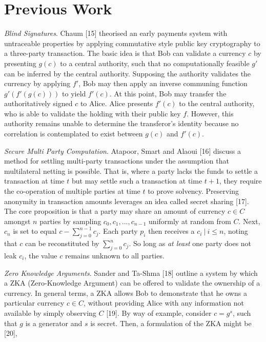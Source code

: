 \section{Previous Work}

\textit{Blind Signatures}. Chaum [15] theorised an early payments system with untraceable properties by applying commutative style public key cryptography to a three-party transaction. The basic idea is that Bob can validate a currency $c$ by presenting $g(c)$ to a central authority, such that no computationally feasible $g'$ can be inferred by the central authority. Supposing the authority validates the currency by applying $f'$, Bob may then apply an inverse communing function $g'(f'(g(c)))$ to yield $f'(c)$. At this point, Bob may transfer the authoritatively signed $c$ to Alice. Alice presents $f'(c)$ to the central authority, who is able to validate the holding with their public key $f$. However, this authority remains unable to determine the transferor's identity because no correlation is contemplated to exist between $g(c)$ and $f'(c)$.

\textit{Secure Multi Party Computation}. Atapoor, Smart and Alaoui [16] discuss a method for settling multi-party transactions under the assumption that multilateral netting is possible. That is, where a party lacks the funds to settle a transaction at time $t$ but may settle such a transaction at time $t + 1$, they require the co-operation of multiple parties at time $t$ to prove solvency. Preserving anonymity in transaction amounts leverages an idea called secret sharing [17]. The core proposition is that a party may share an amount of currency $c \in C$ amongst $n$ parties by sampling $c_0, c_1, ..., c_{n-1}$ uniformly at random from $C$. Next, $c_n$ is set to equal $c - \sum_{j=0}^{n-1} c_j$. Each party $p_i$ then receives a $c_i\ |\ i \leq n$, noting that $c$ can be reconstituted by $\sum_{j=0}^{n} c_j$. So long as \textit{at least} one party does not leak $c_i$, the value $c$ remains unknown to all parties.

\textit{Zero Knowledge Arguments}. Sander and Ta-Shma [18] outline a system by which a ZKA (Zero-Knowledge Argument) can be offered to validate the ownership of a currency. In general terms, a ZKA allows Bob to demonstrate that he owns a particular currency $c \in C$, without providing Alice with any information not available by simply observing $C$ [19]. By way of example, consider $c = g^s$, such that $g$ is a generator and $s$ is secret. Then, a formulation of the ZKA might be [20],

